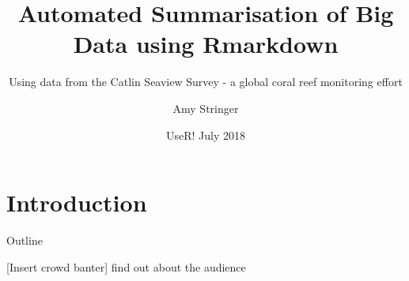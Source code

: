 \documentclass{beamer}
\title{Automated Summarisation of Big Data using Rmarkdown}
\subtitle{Using data from the Catlin Seaview Survey - a global coral reef monitoring effort}
\author{Amy Stringer}
\institute[Global Change Institute] %
{
  \inst{1}%
  University of Queensland
}
\date{UseR! July 2018}
\begin{document}
    \section{Introduction}
        \begin{frame}
          \titlepage
        \end{frame}

        \begin{frame}{Outline}
          \tableofcontents
        \end{frame}

        \begin{frame}
          \begin{block}{[Insert crowd banter]}
              find out about the audience
          \end{block}
        \end{frame}

\end{document}
